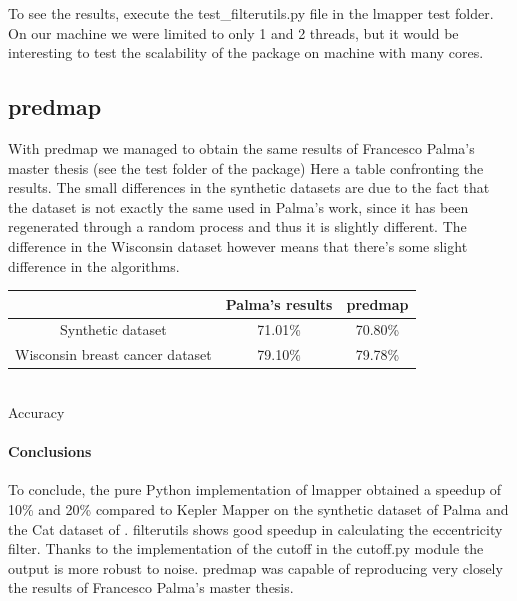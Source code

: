 To see the results, execute the test\_filterutils.py file in the lmapper test folder. On our machine we were limited to only 1 and 2 threads, but it would be interesting to test the scalability of the package on machine with many cores.
\subsection{predmap}
With predmap we managed to obtain the same results of Francesco Palma's master thesis (see the test folder of the package)
Here a table confronting the results. The small differences in the synthetic datasets are due to the fact that the dataset is not exactly the same used in Palma's work, since it has been regenerated through a random process and thus it is slightly different. The difference in the Wisconsin dataset however means that there's some slight difference in the algorithms. 

\begin{center}
	
	\begin{tabular}{ ccc } 
	
		&Palma's results & predmap \\ 
		\hline
		Synthetic dataset & 71.01\% & 70.80\% \\ 
		Wisconsin breast cancer dataset & 79.10\% & 79.78\% \\ 
	\end{tabular}\\
\bigskip
	Accuracy
\end{center}

\paragraph{Conclusions}
To conclude, the pure Python implementation of lmapper obtained a speedup of 10\% and 20\% compared to Kepler Mapper on the synthetic dataset of Palma and the Cat dataset of \cite{pythonmapper}. filterutils shows good speedup in calculating the eccentricity filter. Thanks to the implementation of the cutoff in the cutoff.py module the output is more robust to noise. predmap was capable of reproducing very closely the results of Francesco Palma's master thesis.
